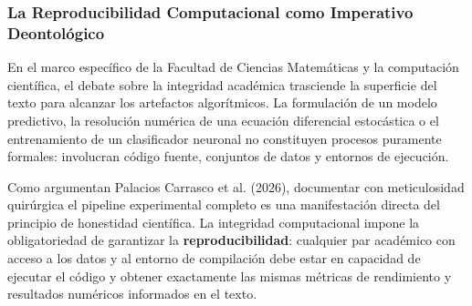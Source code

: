 \subsubsection{La Reproducibilidad Computacional como Imperativo Deontológico}

En el marco específico de la Facultad de Ciencias Matemáticas y la computación científica, el debate sobre la integridad académica trasciende la superficie del texto para alcanzar los artefactos algorítmicos. La formulación de un modelo predictivo, la resolución numérica de una ecuación diferencial estocástica o el entrenamiento de un clasificador neuronal no constituyen procesos puramente formales: involucran código fuente, conjuntos de datos y entornos de ejecución.

Como argumentan Palacios Carrasco et al. (2026), documentar con meticulosidad quirúrgica el pipeline experimental completo es una manifestación directa del principio de honestidad científica. La integridad computacional impone la obligatoriedad de garantizar la \textbf{reproducibilidad}: cualquier par académico con acceso a los datos y al entorno de compilación debe estar en capacidad de ejecutar el código y obtener exactamente las mismas métricas de rendimiento y resultados numéricos informados en el texto.

